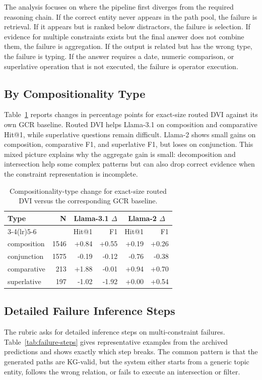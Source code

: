\documentclass[10pt,twocolumn]{article}
\begin{document}
The analysis focuses on where the pipeline first diverges from the required reasoning chain. If the correct entity never appears in the path pool, the failure is retrieval. If it appears but is ranked below distractors, the failure is selection. If evidence for multiple constraints exists but the final answer does not combine them, the failure is aggregation. If the output is related but has the wrong type, the failure is typing. If the answer requires a date, numeric comparison, or superlative operation that is not executed, the failure is operator execution.

\subsection{By Compositionality Type}
Table~\ref{tab:type} reports changes in percentage points for exact-size routed DVI against its own GCR baseline. Routed DVI helps Llama-3.1 on composition and comparative Hit@1, while superlative questions remain difficult. Llama-2 shows small gains on composition, comparative F1, and superlative F1, but loses on conjunction. This mixed picture explains why the aggregate gain is small: decomposition and intersection help some complex patterns but can also drop correct evidence when the constraint representation is incomplete.

\begin{table}[H]
\centering
\small
\begin{tabular}{lrrrrr}
\toprule
Type & N & \multicolumn{2}{c}{Llama-3.1 $\Delta$} & \multicolumn{2}{c}{Llama-2 $\Delta$} \\
\cmidrule(lr){3-4}\cmidrule(lr){5-6}
 & & Hit@1 & F1 & Hit@1 & F1 \\
\midrule
composition & 1546 & +0.84 & +0.55 & +0.19 & +0.26 \\
conjunction & 1575 & -0.19 & -0.12 & -0.76 & -0.38 \\
comparative & 213 & +1.88 & -0.01 & +0.94 & +0.70 \\
superlative & 197 & -1.02 & -1.92 & +0.00 & +0.54 \\
\bottomrule
\end{tabular}
\caption{Compositionality-type change for exact-size routed DVI versus the corresponding GCR baseline.}
\label{tab:type}
\end{table}

\subsection{Detailed Failure Inference Steps}
The rubric asks for detailed inference steps on multi-constraint failures. Table~\ref{tab:failure-steps} gives representative examples from the archived predictions and shows exactly which step breaks. The common pattern is that the generated paths are KG-valid, but the system either starts from a generic topic entity, follows the wrong relation, or fails to execute an intersection or filter.
\end{document}
